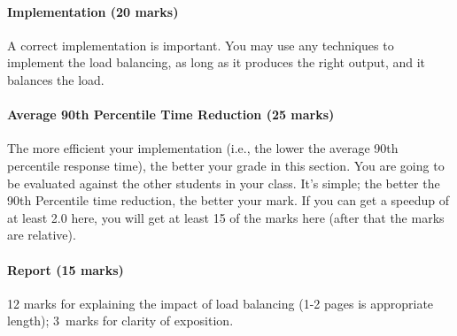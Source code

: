 \documentclass[letterpaper,10pt]{article}
\begin{document}
\paragraph{Implementation (20 marks)} A correct implementation is important. You may use any techniques to implement the load balancing, as long as it produces the right output, and it balances the load.

\paragraph{Average 90th Percentile Time Reduction (25 marks)} The more efficient your implementation (i.e., the lower the average 90th percentile response time), the better your grade in this section.  You are going to be evaluated against the other students in your class. It's simple; the better the 90th Percentile time reduction, the better your mark. If you can get a speedup of at least 2.0 here, you will get at least 15 of the marks here (after that the marks are relative).

\paragraph{Report (15 marks)} 12 marks for explaining the impact of load balancing (1-2 pages is appropriate length); 3~marks for clarity of exposition.
\end{document}
